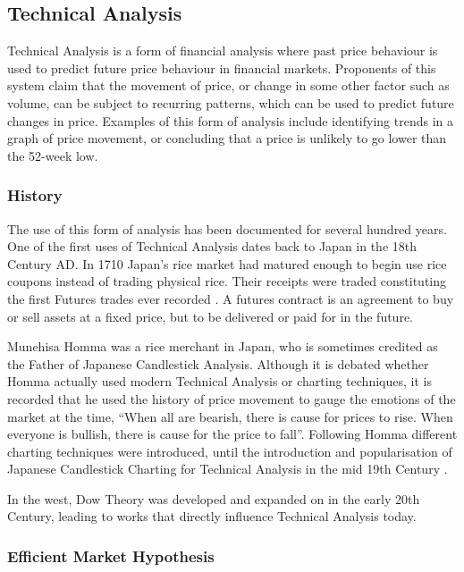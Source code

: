 \documentclass{article}
\begin{document}
\subsection{Technical Analysis}

Technical Analysis is a form of financial analysis where past price behaviour is used to predict future price behaviour in financial markets. Proponents of this system claim that the movement of price, or change in some other factor such as volume, can be subject to recurring patterns, which can be used to predict future changes in price. Examples of this form of analysis include identifying trends in a graph of price movement, or concluding that a price is unlikely to go lower than the 52-week low.

\subsubsection{History}

The use of this form of analysis has been documented for several hundred years. One of the first uses of Technical Analysis dates back to Japan in the 18th Century AD. In 1710 Japan's rice market had matured enough to begin use rice coupons instead of trading physical rice. Their receipts were traded constituting the first Futures trades ever recorded \citep[p.15]{jcct1991}. A futures contract is an agreement to buy or sell assets at a fixed price, but to be delivered or paid for in the future. 

Munehisa Homma was a rice merchant in Japan, who is sometimes credited as the Father of Japanese Candlestick Analysis. Although it is debated whether Homma actually used modern Technical Analysis or charting techniques, it is recorded that he used the history of price movement to gauge the emotions of the market at the time, ``When all are bearish, there is cause for prices to rise. When everyone is bullish, there is cause for the price to fall''. Following Homma different charting techniques were introduced, until the introduction and popularisation of Japanese Candlestick Charting for Technical Analysis in the mid 19th Century \citep{jcct1994}.

In the west, Dow Theory was developed and expanded on in the early 20th Century, leading to works \citep{edwards2012technical} that directly influence Technical Analysis today.

\subsubsection{Efficient Market Hypothesis}
\end{document}
